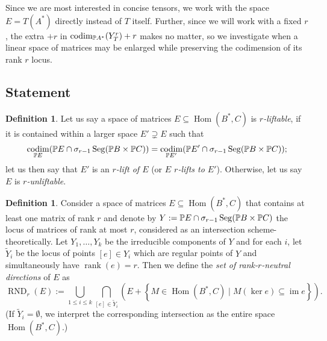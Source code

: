 \documentclass[a4paper,10pt]{article}
\def\zav#1{\left(#1\right)}
\def\set#1{\left\{#1\right\}}
\DeclareMathOperator{\Hom}{Hom}\let\hom\Hom
\DeclareMathOperator{\rank}{rank}\let\rk\rank
\DeclareMathOperator{\im}{im}
\DeclareMathOperator{\codim}{codim}
\DeclareMathOperator{\RND}{RND}
\DeclareMathOperator{\Seg}{Seg}
\theoremstyle{definition}
\newtheorem{definition}[theorem]{Definition}
\theoremstyle{remark}
\begin{document}
Since we are most interested in concise tensors, we work with the space $E=T(A^*)$ directly instead of $T$ itself. Further, since we will work with a fixed $r$, the extra $+r$ in $\codim_{\pe A^*}(Y^r_T)+r$ makes no matter, so we investigate when a linear space of matrices may be enlarged while preserving the codimension of its rank $r$ locus.

\subsection{Statement}

\begin{definition}
    Let us say a space of matrices $E\subseteq \Hom(B^*,C)$ is \emph{$r$-liftable}, if it is contained within a larger space $E'\supsetneq E$ such that
    \[
        \codim_{\pe E}(\pe E\cap \sigma_{r-1}\Seg(\pe B\times\pe C)) = \codim_{\pe E'}({\pe E'}\cap \sigma_{r-1}\Seg(\pe B\times\pe C));
    \]
    let us then say that $E'$ is an \emph{$r$-lift of $E$} (or \emph{$E$ $r$-lifts to $E'$}).
    Otherwise, let us say $E$ is \emph{$r$-unliftable}.
\end{definition}

\begin{definition}
    Consider a space of matrices $E\subseteq \Hom(B^*,C)$ that contains at least one matrix of rank $r$ and denote by $Y:= \pe E\cap\sigma_{r-1}\Seg(\pe B\times\pe C)$ the locus of matrices of rank at most $r$, considered as an intersection scheme-theoretically. Let $Y_1,\dots, Y_k$ be the irreducible components of $Y$ and for each $i$, let $\tilde Y_i$ be the locus of points $[e]\in Y_i$ which are regular points of $Y$ and simultaneously have $\rank(e) = r$.  Then we define the \emph{set of rank-$r$-neutral directions} of $E$ as
    \[
        \RND_r(E) := \bigcup_{1\leq i\leq k} \bigcap_{[e]\in \tilde Y_i} \zav{E + \set{M\in \Hom(B^*,C)\mid M(\ker e)\subseteq \im e}}.
    \]
    (If $\tilde Y_i=\emptyset$, we interpret the corresponding intersection as the entire space $\Hom(B^*,C)$.)
\end{definition}
\end{document}
